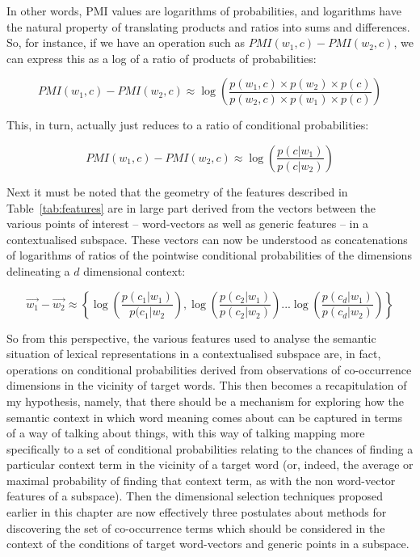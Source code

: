 \noindent In other words, PMI values are logarithms of probabilities, and logarithms have the natural property of translating products and ratios into sums and differences.  So, for instance, if we have an operation such as $PMI(w_1,c)-PMI(w_2,c)$, we can express this as a log of a ratio of products of probabilities:

\begin{equation}
PMI(w_1,c)-PMI(w_2,c) \approx \log\left(\frac{p(w_1,c) \times p(w_2) \times p(c)}{p(w_2,c) \times p(w_1) \times p(c)} \right)
\end{equation}

\noindent This, in turn, actually just reduces to a ratio of conditional probabilities:

\begin{equation} \label{eq:logdif}
PMI(w_1,c)-PMI(w_2,c) \approx \log\left(\frac{p(c|w_1)}{p(c|w_2)}\right)
\end{equation}

\noindent Next it must be noted that the geometry of the features described in Table~\ref{tab:features} are in large part derived from the vectors between the various points of interest -- word-vectors as well as generic features -- in a contextualised subspace.  These vectors can now be understood as concatenations of logarithms of ratios of the pointwise conditional probabilities of the dimensions delineating a $d$ dimensional context:

\begin{equation}
\overrightarrow{w_1}-\overrightarrow{w_2} \approx \left\{ \log\left(\frac{p(c_1|w_1)}{p(c_1|w_2}\right), \log\left(\frac{p(c_2|w_1)}{p(c_2|w_2)}\right)... \log\left(\frac{p(c_d|w_1)}{p(c_d|w_2)}\right)\right\}
\end{equation}

\noindent So from this perspective, the various features used to analyse the semantic situation of lexical representations in a contextualised subspace are, in fact, operations on conditional probabilities derived from observations of co-occurrence dimensions in the vicinity of target words.  This then becomes a recapitulation of my hypothesis, namely, that there should be a mechanism for exploring how the semantic context in which word meaning comes about can be captured in terms of a way of talking about things, with this way of talking mapping more specifically to a set of conditional probabilities relating to the chances of finding a particular context term in the vicinity of a target word (or, indeed, the average or maximal probability of finding that context term, as with the non word-vector features of a subspace).  Then the dimensional selection techniques proposed earlier in this chapter are now effectively three postulates about methods for discovering the set of co-occurrence terms which should be considered in the context of the conditions of target word-vectors and generic points in a subspace.

